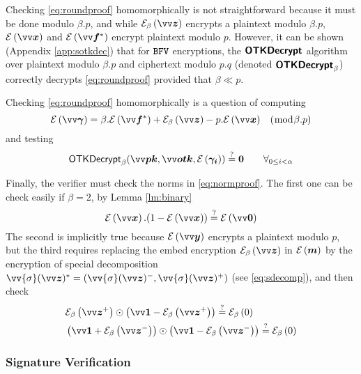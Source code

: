 Checking \cref{eq:roundproof} homomorphically is not straightforward because it must be done modulo $\beta.p$, and while $\senc{\pv{z}}{\beta}$ encrypts a plaintext modulo $\beta.p$, $\enc{\pv{x}}$ and $\enc{\pv{f}^*}$ encrypt plaintext modulo $p$. However, it can be shown (Appendix \ref{app:sotkdec}) that for $\mathtt{BFV}$ encryptions, the $\textsf{\textbf{OTKDecrypt}}$ algorithm over plaintext modulo $\beta.p$ and ciphertext modulo $p.q$ (denoted $\textsf{\textbf{OTKDecrypt}}_{\beta}$) correctly decrypts \cref{eq:roundproof} provided that $\beta\ll p$. 

Checking \cref{eq:roundproof} homomorphically is a question of computing
\[
\enc{\pv{\gamma}}=\beta.\enc{\pv{f}^*}+\senc{\pv{z}}{\beta}-p.\enc{\pv{x}} \;\;\;(\bmod \beta.p)
\]
and testing
\begin{equation}\label{eq:homoroundproof}
   \textsf{OTKDecrypt}_{\beta}(\pv{pk},\pv{otk},\enc{\p{\gamma_i}}) \stackrel{?}{=} \p{0} \quad\quad \forall_{0\leq i < \alpha} 
\end{equation}



Finally, the verifier must check the norms in \cref{eq:normproof}. The first one can be check easily if $\beta=2$, by Lemma \ref{lm:binary}
\begin{equation}\label{eq:hbinprgn}
    \enc{\pv{x}}.(1-\enc{\pv{x}})\stackrel{?}{=}\enc{\pv{0}} 
\end{equation}
The second is implicitly true because $\enc{\pv{y}}$ encrypts a plaintext modulo $p$, but the third requires replacing the embed encryption $\senc{\pv{z}}{\beta}$ in $\mathcal{E}\left({\bm{m}}\right)$ by the encryption of special decomposition $\vv{\sigma}(\pv{z})^*=(\vv{\sigma}(\pv{z})^-,\vv{\sigma}(\pv{z})^+)$ (see \cref{eq:sdecomp}), and then check
\begin{align}
&\senc{\pv{z}^+}{\beta}\odot\left(\pv{1}-\senc{\pv{z}^+}{\beta}\right)\stackrel{?}{=}\senc{0}{\beta} \label{eq:hxparmodulo}\\
&\left(\pv{1}+\senc{\pv{z}^-}{\beta}\right)\odot\left(\pv{1}-\senc{\pv{z}^-}{\beta}\right)\stackrel{?}{=}\senc{0}{\beta} \label{eq:hxparsignal}
\end{align}


\subsubsection{Signature Verification}\label{sec:allsig}

